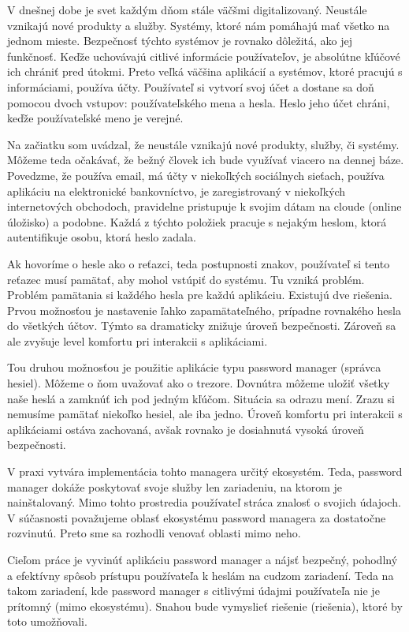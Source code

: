 \indent	V dnešnej dobe je svet každým dňom stále väčšmi digitalizovaný. Neustále vznikajú nové produkty a služby. Systémy, ktoré nám pomáhajú mať všetko na jednom mieste. Bezpečnosť týchto systémov je rovnako dôležitá, ako jej funkčnosť. Keďže uchovávajú citlivé informácie používateľov, je absolútne kľúčové ich chrániť pred útokmi. Preto veľká väčšina aplikácií a systémov, ktoré pracujú s informáciami, používa účty. Používateľ si vytvorí svoj účet a dostane sa doň pomocou dvoch vstupov: používateľského mena a hesla. Heslo jeho účet chráni, keďže používateľské meno je verejné.
	\par Na začiatku som uvádzal, že neustále vznikajú nové produkty, služby, či systémy. Môžeme teda očakávať, že bežný človek ich bude využívať viacero na dennej báze. Povedzme, že používa email, má účty v niekoľkých sociálnych sieťach, používa aplikáciu na elektronické bankovníctvo, je zaregistrovaný v niekoľkých internetových obchodoch, pravidelne pristupuje k svojim dátam na cloude (online úložisko) a podobne. Každá z týchto položiek pracuje s nejakým heslom, ktorá autentifikuje osobu, ktorá heslo zadala.
	\par Ak hovoríme o hesle ako o reťazci, teda postupnosti znakov, používateľ si tento reťazec musí pamätať, aby mohol vstúpiť do systému. Tu vzniká problém. Problém pamätania si každého hesla pre každú aplikáciu. Existujú dve riešenia. Prvou možnosťou je nastavenie ľahko zapamätateľného, prípadne rovnakého hesla do všetkých účtov. Týmto sa dramaticky znižuje úroveň bezpečnosti. Zároveň sa ale zvyšuje level komfortu pri interakcii s aplikáciami.
	\par Tou druhou možnosťou je použitie aplikácie typu password manager (správca hesiel). Môžeme o ňom uvažovať ako o trezore. Dovnútra môžeme uložiť všetky naše heslá a zamknúť ich pod jedným kľúčom. Situácia sa odrazu mení. Zrazu si nemusíme pamätať niekoľko hesiel, ale iba jedno. Úroveň komfortu pri interakcii s aplikáciami ostáva zachovaná, avšak rovnako je dosiahnutá vysoká úroveň bezpečnosti.
	\par V praxi vytvára implementácia tohto managera určitý ekosystém. Teda, password manager dokáže poskytovať svoje služby len zariadeniu, na ktorom je nainštalovaný. Mimo tohto prostredia používateľ stráca znalosť o svojich údajoch. V súčasnosti považujeme oblasť ekosystému password managera za dostatočne rozvinutú. Preto sme sa rozhodli venovať oblasti mimo neho.
	\par Cieľom práce je vyvinúť aplikáciu password manager a nájsť bezpečný, pohodlný a efektívny spôsob prístupu používateľa k heslám na cudzom zariadení. Teda na takom zariadení, kde password manager s citlivými údajmi používateľa nie je prítomný (mimo ekosystému). Snahou bude vymyslieť riešenie (riešenia), ktoré by toto umožňovali.